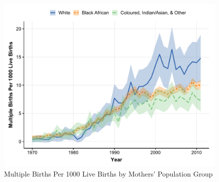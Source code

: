 


\begin{figure}[!th]
\centering
\caption{\label{fig:line-pp}Multiple Births Per 1000 Live Births by Mothers' Population Group}
\includegraphics[width=\textwidth]{figures/line_rib.pdf}
\end{figure}

 
\pagebreak



